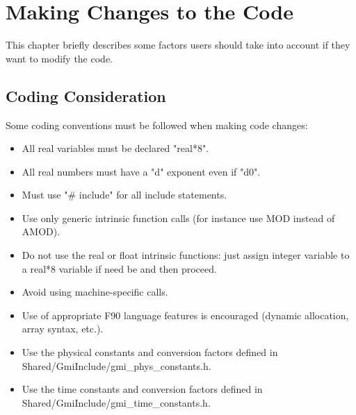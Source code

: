 \chapter[Making Changes]{Making Changes to the Code} \label{chap:changes}
%
This chapter briefly describes some factors users should take into account
if they want to modify the code.

\section{Coding Consideration}
%
Some coding conventions must be followed when making code changes:
\begin{itemize}
\item All real variables must be declared "real*8".
\item All real numbers must have a "d" exponent even if "d0".
\item Must use "\# include" for all include statements.
\item Use only generic intrinsic function calls (for instance use MOD instead of AMOD).
\item Do not use the real or float intrinsic functions: just assign integer variable to a
      real*8 variable if need be and then proceed.
\item Avoid using machine-specific calls.
\item Use of appropriate F90 language features is encouraged (dynamic allocation, array
      syntax, etc.).
\item Use the physical constants and conversion factors defined in \\
      Shared/GmiInclude/gmi\_phys\_constants.h.
\item Use the time constants and conversion factors defined in \\
      Shared/GmiInclude/gmi\_time\_constants.h.
\end{itemize}

